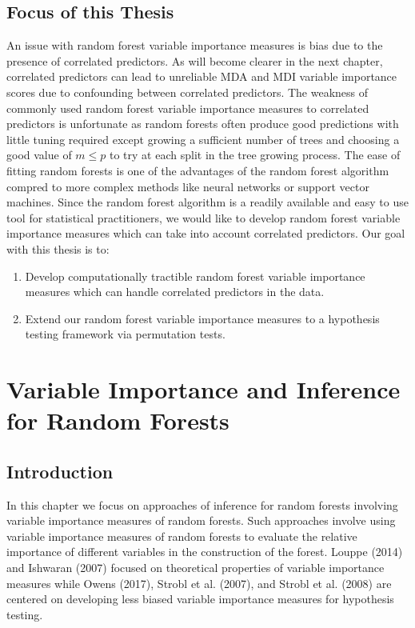 \documentclass[12pt,twoside]{reedthesis}
\theoremstyle{definition}
\theoremstyle{definition}
\theoremstyle{definition}
\theoremstyle{remark}
\begin{document}
\section{Focus of this Thesis}\label{focus-of-this-thesis}

An issue with random forest variable importance measures is bias due to
the presence of correlated predictors. As will become clearer in the
next chapter, correlated predictors can lead to unreliable MDA and MDI
variable importance scores due to confounding between correlated
predictors. The weakness of commonly used random forest variable
importance measures to correlated predictors is unfortunate as random
forests often produce good predictions with little tuning required
except growing a sufficient number of trees and choosing a good value of
\(m\leq p\) to try at each split in the tree growing process. The ease
of fitting random forests is one of the advantages of the random forest
algorithm compred to more complex methods like neural networks or
support vector machines. Since the random forest algorithm is a readily
available and easy to use tool for statistical practitioners, we would
like to develop random forest variable importance measures which can
take into account correlated predictors. Our goal with this thesis is
to:
\begin{enumerate}
  \item Develop computationally tractible random forest variable importance measures which can handle correlated predictors in the data. 
  \item Extend our random forest variable importance measures to a hypothesis testing framework via permutation tests. 
  \end{enumerate}
\par

\chapter{Variable Importance and Inference for Random
Forests}\label{variable-importance-and-inference-for-random-forests}

\section{Introduction}\label{introduction-1}

In this chapter we focus on approaches of inference for random forests
involving variable importance measures of random forests. Such
approaches involve using variable importance measures of random forests
to evaluate the relative importance of different variables in the
construction of the forest. Louppe (2014) and Ishwaran (2007) focused on
theoretical properties of variable importance measures while Owens
(2017), Strobl et al. (2007), and Strobl et al. (2008) are centered on
developing less biased variable importance measures for hypothesis
testing. \par
\end{document}
